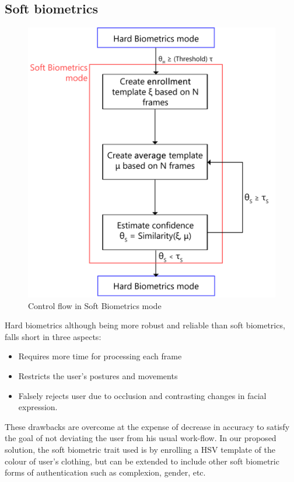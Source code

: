 \documentclass[%
        final,
        internal,
        notitlepage,
        narroweqnarray,
        inline,
        ]{ieee}
\begin{document}
\subsection{Soft biometrics}
\begin{figure}[h!]
	\centering
	\includegraphics[scale=0.5]{img/soft_f.png}
	\caption{Control flow in Soft Biometrics mode}
	\label{fig:cfsb}
\end{figure}
Hard biometrics although being more robust and reliable than soft biometrics, falls short in three aspects\cite{Niin10}:
\begin{itemize}
	\item Requires more time for processing each frame
	\item Restricts the user's postures and movements
	\item Falsely rejects user due to occlusion and contrasting changes in facial expression.
\end{itemize}
These drawbacks are overcome at the expense of decrease in accuracy to satisfy the goal of not deviating the user from his usual work-flow. 
In our proposed solution, the soft biometric trait used is by enrolling a HSV template of the colour of user's clothing, but can be extended to include other soft biometric forms of authentication such as complexion, gender\cite{Jain204}, etc. 
\end{document}
